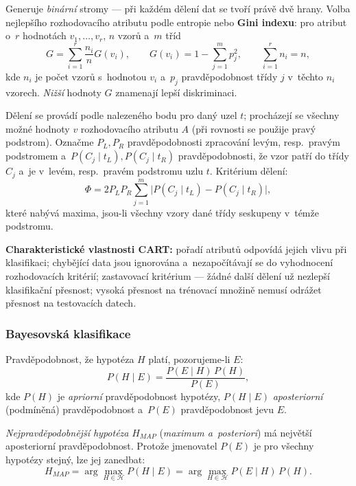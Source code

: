\documentclass[11pt,a4paper]{article}
\theoremstyle{definition}
\begin{document}
\begin{defbox}
Generuje \emph{binární} stromy --- při každém dělení dat se tvoří právě dvě hrany. Volba
nejlepšího rozhodovacího atributu podle entropie nebo \textbf{Gini indexu}: pro atribut
o~$r$ hodnotách $v_1,\dots,v_r$, $n$ vzorů a~$m$ tříd
\[ G=\sum_{i=1}^{r}\frac{n_i}{n}G(v_i),\qquad G(v_i)=1-\sum_{j=1}^{m}p_j^2,
   \qquad \sum_{i=1}^{r}n_i=n, \]
kde $n_i$ je počet vzorů s~hodnotou $v_i$ a~$p_j$ pravděpodobnost třídy $j$ v~těchto $n_i$
vzorech. \emph{Nižší} hodnoty $G$ znamenají lepší diskriminaci.

Dělení se provádí podle  nalezeného bodu pro daný uzel $t$; procházejí se
všechny možné hodnoty $v$ rozhodovacího atributu $A$ (při rovnosti se použije pravý
podstrom). Označme $P_L,P_R$ pravděpodobnosti zpracování levým, resp.\ pravým podstromem
a~$P(C_j\mid t_L),P(C_j\mid t_R)$ pravděpodobnosti, že vzor patří do třídy $C_j$ a~je v~levém,
resp.\ pravém podstromu uzlu $t$. Kritérium dělení:
\[ \Phi=2P_LP_R\sum_{j=1}^{m}\big|P(C_j\mid t_L)-P(C_j\mid t_R)\big|, \]
které nabývá maxima, jsou-li všechny vzory dané třídy seskupeny v~témže podstromu.

\textbf{Charakteristické vlastnosti CART:} pořadí atributů odpovídá jejich vlivu při
klasifikaci; chybějící data jsou ignorována a~nezapočítávají se do vyhodnocení rozhodovacích
kritérií; zastavovací kritérium --- žádné další dělení už nezlepší klasifikační přesnost;
vysoká přesnost na trénovací množině nemusí odrážet přesnost na testovacích datech.
\end{defbox}

\subsubsection{Bayesovská klasifikace}

\begin{defbox}
Pravděpodobnost, že hypotéza $H$ platí, pozorujeme-li $E$:
\[ P(H\mid E)=\frac{P(E\mid H)\,P(H)}{P(E)}, \]
kde $P(H)$ je \emph{apriorní} pravděpodobnost hypotézy, $P(H\mid E)$ \emph{aposteriorní}
(podmíněná) pravděpodobnost a~$P(E)$ pravděpodobnost jevu $E$.

\emph{Nejpravděpodobnější hypotéza} $H_{MAP}$ (\emph{maximum a~posteriori}) má největší
aposteriorní pravděpodobnost. Protože jmenovatel $P(E)$ je pro všechny hypotézy stejný, lze
jej zanedbat:
\[ H_{MAP}=\arg\max_{H\in\mathcal H} P(H\mid E)=\arg\max_{H\in\mathcal H} P(E\mid H)\,P(H). \]
\end{defbox}
\end{document}
